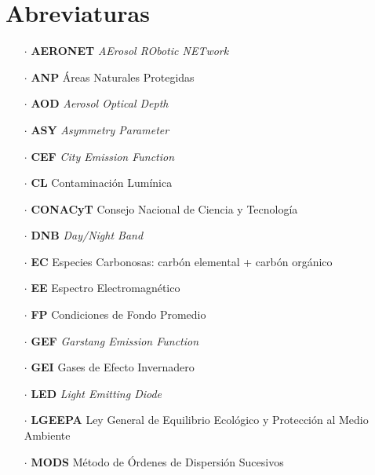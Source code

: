 \chapter{Abreviaturas}

\begin{itemize}

\item[$\cdot$] \textbf{AERONET} \textit{AErosol RObotic NETwork}

\item[$\cdot$] \textbf{ANP} Áreas Naturales Protegidas

\item[$\cdot$] \textbf{AOD} \textit{Aerosol Optical Depth}

\item[$\cdot$] \textbf{ASY} \textit{Asymmetry Parameter}

\item[$\cdot$] \textbf{CEF} \textit{City Emission Function}

\item[$\cdot$] \textbf{CL} Contaminación Lumínica

\item[$\cdot$] \textbf{CONACyT} Consejo Nacional de Ciencia y Tecnología

\item[$\cdot$] \textbf{DNB} \textit{Day/Night Band}

\item[$\cdot$] \textbf{EC} Especies Carbonosas: carbón elemental + carbón orgánico

\item[$\cdot$] \textbf{EE} Espectro Electromagnético

\item[$\cdot$] \textbf{FP} Condiciones de Fondo Promedio

\item[$\cdot$] \textbf{GEF} \textit{Garstang Emission Function}

\item[$\cdot$] \textbf{GEI} Gases de Efecto Invernadero

\item[$\cdot$] \textbf{LED} \textit{Light Emitting Diode}

\item[$\cdot$] \textbf{LGEEPA} Ley General de Equilibrio Ecológico y Protección al Medio Ambiente

\item[$\cdot$] \textbf{MODS} Método de Órdenes de Dispersión Sucesivos


\end{itemize}
